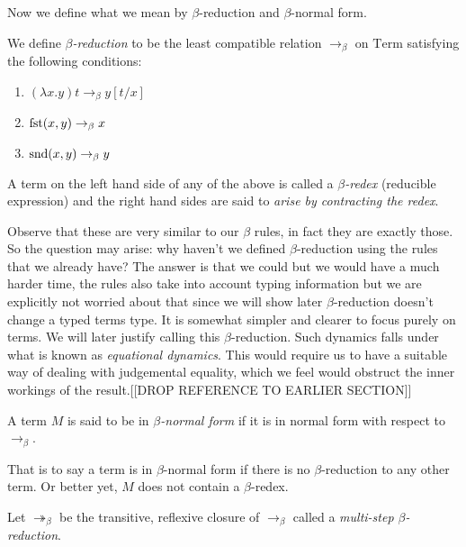 Now we define what we mean by $\beta$-reduction and $\beta$-normal form.

\begin{defin}\label{beta_reduction}
    We define \emph{$\beta$-reduction} to be the least compatible relation $\to_{\beta}$ on $\mathrm{Term}$ satisfying the following conditions:
    \begin{enumerate}
        \item $(\lambda x . y)t \to_{\beta} y [t / x]$
        \item $\mathrm{fst}(x,y) \to_{\beta} x$
        \item $\mathrm{snd}(x,y) \to_{\beta} y$
    \end{enumerate}
    A term on the left hand side of any of the above is called a \emph{$\beta$-redex} (reducible expression) and the right hand sides are said to \emph{arise by contracting the redex}.
\end{defin}

\begin{remark}
    Observe that these are very similar to our $\beta$ rules, in fact they are exactly those. So the question may arise: why haven't we defined $\beta$-reduction using the rules that we already have? The answer is that we could but we would have a much harder time, the rules also take into account typing information but we are explicitly not worried about that since we will show later $\beta$-reduction doesn't change a typed terms type. It is somewhat simpler and clearer to focus purely on terms. We will later justify calling this $\beta$-reduction.
    Such dynamics falls under what is known as \emph{equational dynamics}. This would require us to have a suitable way of dealing with judgemental equality, which we feel would obstruct the inner workings of the result.[[DROP REFERENCE TO EARLIER SECTION]]
\end{remark}

\begin{defin}
    A term $M$ is said to be in \emph{$\beta$-normal form} if it is in normal form with respect to $\to_\beta$.
\end{defin}

\begin{remark}
    That is to say a term is in $\beta$-normal form if there is no $\beta$-reduction to any other term. Or better yet, $M$ does not contain a $\beta$-redex.
\end{remark}

\begin{defin}
    Let $\twoheadrightarrow_{\beta}$ be the transitive, reflexive closure of $\to_{\beta}$ called a \emph{multi-step $\beta$-reduction}.
\end{defin}

